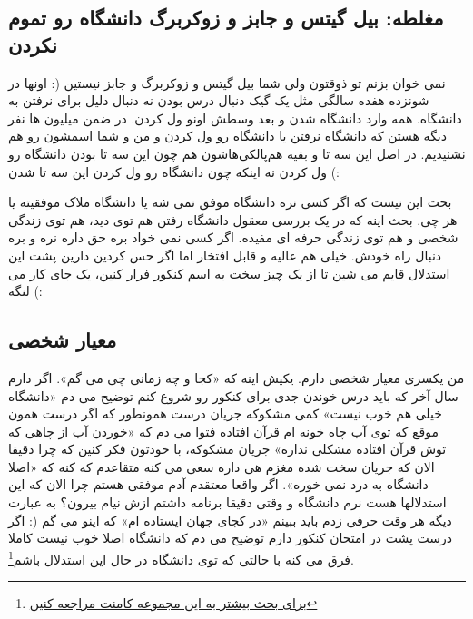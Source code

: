 \subsection*{مغلطه: بیل گیتس و جابز و زوکربرگ دانشگاه رو تموم نکردن}
نمی خوان بزنم تو ذوقتون ولی شما بیل گیتس و زوکربرگ و جابز نیستین (: اونها در شونزده هفده سالگی مثل یک گیک دنبال درس بودن نه دنبال دلیل برای نرفتن به دانشگاه. همه وارد دانشگاه شدن و بعد وسطش اونو ول کردن. در ضمن میلیون ها نفر دیگه هستن که دانشگاه نرفتن یا دانشگاه رو ول کردن و من و شما اسمشون رو هم نشنیدیم. در اصل این سه تا و بقیه هم‌پالکی‌هاشون هم چون این سه تا بودن دانشگاه رو ول کردن نه اینکه چون دانشگاه رو ول کردن این سه تا شدن (:

بحث این نیست که اگر کسی نره دانشگاه موفق نمی شه یا دانشگاه ملاک موفقیته یا هر چی. بحث اینه که در یک بررسی معقول دانشگاه رفتن هم توی دید، هم توی زندگی شخصی و هم توی زندگی حرفه ای مفیده. اگر کسی نمی خواد بره حق داره نره و بره دنبال راه خودش. خیلی هم عالیه و قابل افتخار اما اگر حس کردین دارین پشت این استدلال قایم می شین تا از یک چیز سخت به اسم کنکور فرار کنین، یک جای کار می لنگه (:
\subsection*{معیار شخصی}
من یکسری معیار شخصی دارم. یکیش اینه که «کجا و چه زمانی چی می گم». اگر دارم سال آخر که باید درس خوندن جدی برای کنکور رو شروع کنم توضیح می دم «دانشگاه خیلی هم خوب نیست» کمی مشکوکه جریان درست همونطور که اگر درست همون موقع که توی آب چاه خونه ام قرآن افتاده فتوا می دم که «خوردن آب از چاهی که توش قرآن افتاده مشکلی نداره» جریان مشکوکه، با خودتون فکر کنین که چرا دقیقا الان که جریان سخت شده مغزم هی داره سعی می کنه متقاعدم که کنه که «اصلا دانشگاه به درد نمی خوره». اگر واقعا معتقدم آدم موفقی هستم چرا الان که این استدلالها هست نرم دانشگاه و وقتی دقیقا برنامه داشتم ازش نیام بیرون؟ به عبارت دیگه هر وقت حرفی زدم باید ببینم «در کجای جهان ایستاده ام» که اینو می گم (: اگر درست پشت در امتحان کنکور دارم توضیح می دم که دانشگاه اصلا خوب نیست کاملا فرق می کنه با حالتی که توی دانشگاه در حال این استدلال باشم\footnote{\href{http://jadi.net2012/09/is-university-good-for-you/)}{برای بحث بیشتر به این مجموعه کامنت مراجعه کنین}}.
